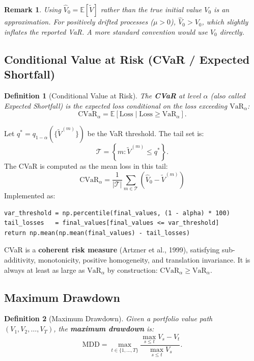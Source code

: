 \documentclass[12pt, a4paper]{article}
\newtheorem{definition}{Definition}[section]
\newtheorem{remark}{Remark}[section]
\begin{document}
\begin{remark}
    Using $\hat{V}_0 = \mathbb{E}[\widetilde{V}]$ rather than the true initial
    value $V_0$ is an approximation. For positively drifted processes ($\mu > 0$),
    $\hat{V}_0 > V_0$, which slightly inflates the reported VaR. A more standard
    convention would use $V_0$ directly.
\end{remark}

\subsection{Conditional Value at Risk (CVaR / Expected Shortfall)}

\begin{definition}[Conditional Value at Risk]
    The \textbf{CVaR} at level $\alpha$ (also called \emph{Expected Shortfall})
    is the expected loss conditional on the loss exceeding $\mathrm{VaR}_\alpha$:
    \[
        \mathrm{CVaR}_\alpha = \mathbb{E}\!\left[\text{Loss} \mid \text{Loss} \geq \mathrm{VaR}_\alpha\right].
    \]
\end{definition}

Let $q^* = q_{1-\alpha}(\{\widetilde{V}^{(m)}\})$ be the VaR threshold. The
tail set is:
\[
    \mathcal{T} = \left\{m : \widetilde{V}^{(m)} \leq q^*\right\}.
\]
The CVaR is computed as the mean loss in this tail:
\begin{equation}
    \boxed{\mathrm{CVaR}_\alpha = \frac{1}{|\mathcal{T}|}\sum_{m \in \mathcal{T}}
    \left(\hat{V}_0 - \widetilde{V}^{(m)}\right)}
    \label{eq:cvar}
\end{equation}
Implemented as:
\begin{lstlisting}
var_threshold = np.percentile(final_values, (1 - alpha) * 100)
tail_losses   = final_values[final_values <= var_threshold]
return np.mean(np.mean(final_values) - tail_losses)
\end{lstlisting}

CVaR is a \textbf{coherent risk measure} (Artzner et al., 1999), satisfying
sub-additivity, monotonicity, positive homogeneity, and translation invariance.
It is always at least as large as $\mathrm{VaR}_\alpha$ by construction:
$\mathrm{CVaR}_\alpha \geq \mathrm{VaR}_\alpha$.

\subsection{Maximum Drawdown}

\begin{definition}[Maximum Drawdown]
    Given a portfolio value path $(V_1, V_2, \ldots, V_T)$, the
    \textbf{maximum drawdown} is:
    \[
        \mathrm{MDD} = \max_{t \in \{1,\ldots,T\}} \frac{\max_{s \leq t} V_s - V_t}
                    {\max_{s \leq t} V_s}.
    \]
\end{definition}
\end{document}
